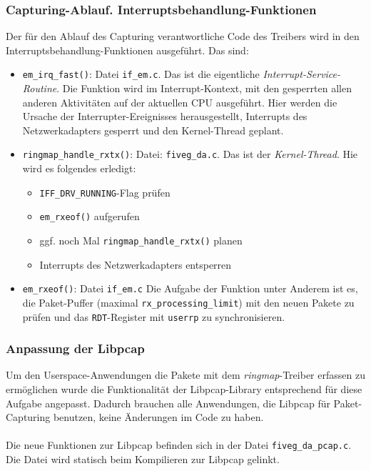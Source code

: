 \subsubsection*{Capturing-Ablauf. Interruptsbehandlung-Funktionen}
Der für den Ablauf des Capturing verantwortliche Code des Treibers wird 
in den Interruptsbehandlung-Funktionen ausgeführt. Das sind:
\begin{itemize}
	\item \verb+em_irq_fast()+: Datei \verb+if_em.c+. Das ist die eigentliche
		\emph{Interrupt-Service-Routine}. Die Funktion wird im
		Interrupt-Kontext, mit den gesperrten allen anderen Aktivitäten auf der
		aktuellen CPU ausgeführt. Hier werden die Ursache der
		Interrupter-Ereignisses herausgestellt, Interrupts des Netzwerkadapters
		gesperrt und den Kernel-Thread geplant.
	\item \verb+ringmap_handle_rxtx()+: Datei: \verb+fiveg_da.c+. Das ist der
		\emph{Kernel-Thread}. Hie wird es folgendes erledigt: 
		\begin{itemize}
			\item \verb+IFF_DRV_RUNNING+-Flag prüfen
			\item \verb+em_rxeof()+ aufgerufen
			\item ggf. noch Mal \verb+ringmap_handle_rxtx()+ planen
			\item Interrupts des Netzwerkadapters entsperren
		\end{itemize}
	\item \verb+em_rxeof()+: Datei \verb+if_em.c+ Die Aufgabe der Funktion
		unter Anderem ist es, die Paket-Puffer (maximal
		\verb+rx_processing_limit+) mit den neuen Pakete zu prüfen und das
		\verb+RDT+-Register mit \verb+userrp+ zu synchronisieren.
\end{itemize}
\subsubsection{Anpassung der Libpcap}
Um den Userspace-Anwendungen die Pakete mit dem \emph{ringmap}-Treiber erfassen zu ermöglichen
wurde die Funktionalität der Libpcap-Library entsprechend für diese Aufgabe angepasst. 
Dadurch brauchen alle Anwendungen, die Libpcap für Paket-Capturing benutzen, keine 
Änderungen im Code zu haben. \\\\
%
Die neue Funktionen zur Libpcap befinden sich in der Datei \verb+fiveg_da_pcap.c+.
Die Datei wird statisch beim Kompilieren zur Libpcap gelinkt.

